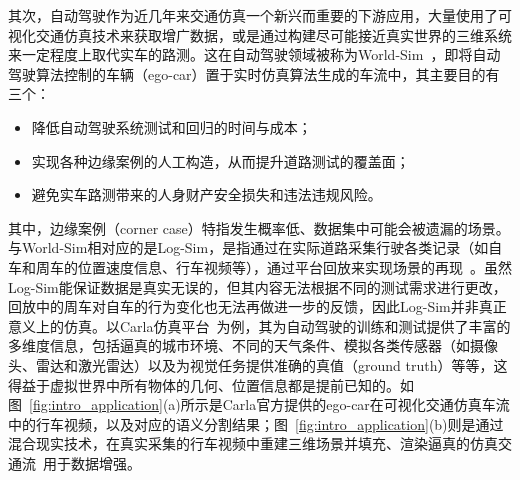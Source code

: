其次，自动驾驶作为近几年来交通仿真一个新兴而重要的下游应用，大量使用了可视化交通仿真技术来获取增广数据，或是通过构建尽可能接近真实世界的三维系统来一定程度上取代实车的路测。这在自动驾驶领域被称为World-Sim~\cite{hu2023ir, wang2023interpretable}，即将自动驾驶算法控制的车辆（ego-car）置于实时仿真算法生成的车流中，其主要目的有三个：
\begin{itemize}
    \item 降低自动驾驶系统测试和回归的时间与成本；
    \item 实现各种边缘案例的人工构造，从而提升道路测试的覆盖面；
    \item 避免实车路测带来的人身财产安全损失和违法违规风险。
\end{itemize}
其中，边缘案例（corner case）特指发生概率低、数据集中可能会被遗漏的场景。与World-Sim相对应的是Log-Sim，是指通过在实际道路采集行驶各类记录（如自车和周车的位置速度信息、行车视频等），通过平台回放来实现场景的再现~\cite{hu2023ir, wang2023interpretable}。虽然Log-Sim能保证数据是真实无误的，但其内容无法根据不同的测试需求进行更改，回放中的周车对自车的行为变化也无法再做进一步的反馈，因此Log-Sim并非真正意义上的仿真。以Carla仿真平台~\cite{dosovitskiy2017carla}为例，其为自动驾驶的训练和测试提供了丰富的多维度信息，包括逼真的城市环境、不同的天气条件、模拟各类传感器（如摄像头、雷达和激光雷达）以及为视觉任务提供准确的真值（ground truth）等等，这得益于虚拟世界中所有物体的几何、位置信息都是提前已知的。如图~\ref{fig:intro_application}(a)所示是Carla官方提供的ego-car在可视化交通仿真车流中的行车视频，以及对应的语义分割结果；图~\ref{fig:intro_application}(b)则是通过混合现实技术，在真实采集的行车视频中重建三维场景并填充、渲染逼真的仿真交通流~\cite{li2019aads}用于数据增强。


